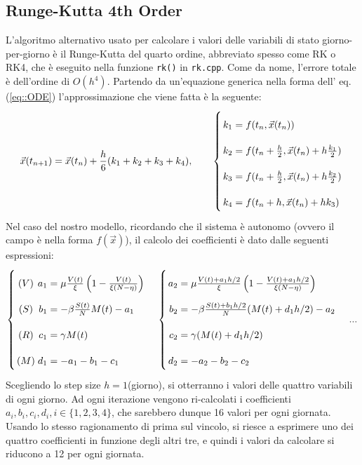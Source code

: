 \documentclass{article}
\begin{document}
\subsection{Runge-Kutta 4th Order}
L'algoritmo alternativo usato per calcolare i valori delle variabili di 
stato giorno-per-giorno è il Runge-Kutta del quarto ordine, abbreviato 
spesso come RK o RK4, che è eseguito nella funzione \verb|rk()| in 
\verb|rk.cpp|.
Come da nome, l'errore totale è dell'ordine di $O(h^4)$.
Partendo da un'equazione generica nella forma dell' eq. (\ref{eq::ODE})
l'approssimazione che viene fatta è la seguente: \\
\begin{equation} \label{eq::rk4}
    \vec{x}(t_{n+1})=\vec{x}(t_n)+\frac{h}{6}(k_1+k_2+k_3+k_4), \qquad
    \left\{ \arraycolsep=1.4pt\def\arraystretch{2.2}
    \begin{array}{rcl}
    k_1 & = & f(t_n, \vec{x}(t_n)) \\
    k_2 & = & f(t_n+\frac{h}{2}, \vec{x}(t_n)+h\frac{k_1}{2}) \\
    k_3 & = & f(t_n+\frac{h}{2}, \vec{x}(t_n)+h\frac{k_2}{2}) \\
    k_4 & = & f(t_n+h, \vec{x}(t_n)+hk_3) \\
    \end{array}\right.
\end{equation}
Nel caso del nostro modello, ricordando che il sistema è autonomo (ovvero
il campo è nella forma $f(\vec{x})$), il calcolo dei coefficienti è dato 
dalle seguenti espressioni:
\begin{equation} \label{eq::rk4Coeff}
    \left\{ \arraycolsep=1.4pt\def\arraystretch{2.2}
    \begin{array}{crcl}
    (V) & a_1 & = & \mu \frac{V(t)}{\xi}\left(1-\frac{V(t)}
    {\xi(N-\eta)}\right) \\
    (S) & b_1 & = &  -\beta\frac{S(t)}{N}M(t)-a_1\\
    (R) & c_1 & = &  \gamma M(t)\\
    (M) & d_1 & = &  -a_1-b_1-c_1 \\
    \end{array}\right. \quad
    \left\{ \arraycolsep=1.4pt\def\arraystretch{2.2}
    \begin{array}{rcl}
    a_2 & = & \mu \frac{V(t) + a_1 h/2}{\xi}\left(1-\frac{V(t)+
    a_1 h/2}{\xi(N-\eta)}\right) \\
    b_2 & = &  -\beta\frac{S(t)+b_1 h/2}{N}(M(t)+d_1 h/2)-a_2\\
    c_2 & = &  \gamma (M(t)+d_1 h/2)\\
    d_2 & = &  -a_2-b_2-c_2 \\
    \end{array}\right. \quad ...
\end{equation}
Scegliendo lo step size $h=1$(giorno), si otterranno i valori delle 
quattro variabili di ogni giorno. Ad ogni iterazione vengono ri-calcolati
i coefficienti $a_i, b_i, c_i,d_i, i \in \{1,2,3,4\}$, che sarebbero dunque
16 valori per ogni giornata. Usando lo stesso ragionamento di prima sul 
vincolo, si riesce a esprimere uno dei quattro coefficienti in funzione 
degli altri  tre, e quindi i valori da calcolare si riducono a 12 per ogni 
giornata.\\
\end{document}
